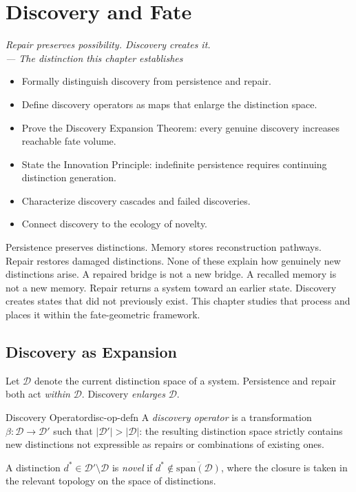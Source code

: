 \documentclass[12pt,twoside,openright]{book}
\newcommand{\distset}{\mathcal{D}}        %
\newenvironment{epigraph}[2]{%
  \vspace{1em}\begin{flushright}
  \begin{minipage}{0.72\textwidth}
  \itshape\small #1\\[0.4em]
  \upshape\footnotesize\sffamily\color{DistGray}--- #2
  \end{minipage}\end{flushright}\vspace{1.5em}}{}
\newenvironment{objectives}{%
  \begin{tcolorbox}[colback=DistBlue!5,colframe=DistBlue,
    title={\faCheckCircle\enspace Chapter Objectives},
    fonttitle=\sffamily\bfseries\color{white},
    attach boxed title to top left={yshift=-2mm,xshift=4mm},
    boxed title style={colback=DistBlue},breakable]
  \begin{itemize}[leftmargin=*,nosep]}{%
  \end{itemize}\end{tcolorbox}\vspace{1em}}
\providecommand{\discOp}{\beta}
\begin{document}

\chapter{Discovery and Fate}
\label{ch:discovery-fate}

\begin{epigraph}{Repair preserves possibility. Discovery creates
  it.}{The distinction this chapter establishes}
\end{epigraph}

\begin{objectives}
\item Formally distinguish discovery from persistence and repair.
\item Define discovery operators as maps that enlarge the
  distinction space.
\item Prove the Discovery Expansion Theorem: every genuine
  discovery increases reachable fate volume.
\item State the Innovation Principle: indefinite persistence
  requires continuing distinction generation.
\item Characterize discovery cascades and failed discoveries.
\item Connect discovery to the ecology of novelty.
\end{objectives}

Persistence preserves distinctions. Memory stores reconstruction
pathways. Repair restores damaged distinctions. None of these
explain how genuinely new distinctions arise. A repaired bridge
is not a new bridge. A recalled memory is not a new memory.
Repair returns a system toward an earlier state. Discovery
creates states that did not previously exist. This chapter
studies that process and places it within the fate-geometric
framework.

\section{Discovery as Expansion}

Let $\distset$ denote the current distinction space of a system.
Persistence and repair both act \emph{within} $\distset$.
Discovery \emph{enlarges} $\distset$.

\begin{definition}{Discovery Operator}{disc-op-defn}
A \emph{discovery operator} is a transformation
$\discOp:\distset\to\distset'$ such that
$|\distset'|>|\distset|$: the resulting distinction space
strictly contains new distinctions not expressible as repairs
or combinations of existing ones.

A distinction $d^*\in\distset'\setminus\distset$ is
\emph{novel} if $d^*\notin\overline{\mathrm{span}(\distset)}$,
where the closure is taken in the relevant topology on the
space of distinctions.
\end{definition}
\end{document}
